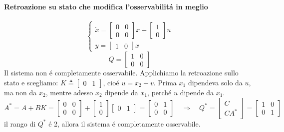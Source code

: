 \documentclass[../main.tex]{subfiles}
\begin{document}
		\begin{mdframed}[style=Esempio]
			\paragraph{Retroazione su stato che modifica l'osservabilit\'a in meglio}
			\[
				\begin{cases}
					\dot x =
					\begin{bmatrix}
						0 & 0\\
						0 & 0
					\end{bmatrix} x+
					\begin{bmatrix}
						1\\
						0
					\end{bmatrix} u
					\\[1em]
					y = 
					\begin{bmatrix}
						1 & 0
					\end{bmatrix} x
				\end{cases}
			\]
			\[
				Q=
				\begin{bmatrix}
					1 & 0\\
					0 & 0
				\end{bmatrix}
			\]
			Il sistema non \'e completamente osservabile. Applichiamo la retroazione sullo stato e scegliamo: $ K \triangleq \begin{bmatrix} 0 & 1 \end{bmatrix} $, cio\'e $ u = x_2 + v $. Prima $ x_1 $ dipendeva solo da $ u $, ma non da $ x_2 $, mentre adesso $ x_2 $ dipende da $ x_1 $, perch\'e $ u $ dipende da $ x_1 $.
			\[
				A^{*} = A+BK = 
				\begin{bmatrix}
					0 & 0\\
					0 & 0
				\end{bmatrix} + 
				\begin{bmatrix}
					1\\
					0
				\end{bmatrix}
				\begin{bmatrix}
					0 & 1
				\end{bmatrix} = 
				\begin{bmatrix}
					0 & 1\\
					0 & 0
				\end{bmatrix}
				\quad\Rightarrow\quad
				Q^{*} =
				\begin{bmatrix}
					C\\
					CA^{*}
				\end{bmatrix} =
				\begin{bmatrix}
					1 & 0\\
					0 & 1
				\end{bmatrix}
			\]
			il rango di $ Q^{*} $ \'e 2, allora il sistema \'e completamente osservabile.
		\end{mdframed}
		
\end{document}
